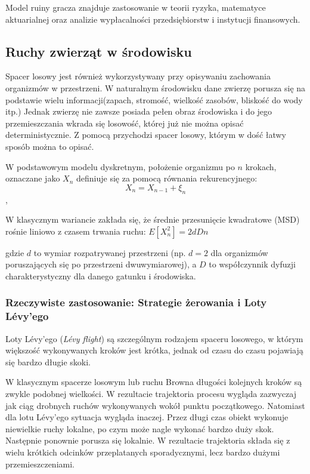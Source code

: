 Model ruiny gracza znajduje zastosowanie w teorii ryzyka, matematyce aktuarialnej oraz analizie wypłacalności przedsiębiorstw i instytucji finansowych.

\subsection{Ruchy zwierząt w środowisku}

Spacer losowy jest również wykorzystywany przy opisywaniu zachowania organizmów w przestrzeni.
W naturalnym środowisku dane zwierzę porusza się na podstawie wielu informacji(zapach, stromość, wielkość zasobów, bliskość do wody itp.) Jednak zwierzę nie zawsze posiada pełen obraz środowiska i do jego przemieszczania wkrada się losowość, której już nie można opisać deterministycznie. Z pomocą przychodzi spacer losowy, którym w dość łatwy sposób można to opisać.

W podstawowym modelu dyskretnym, położenie organizmu po $n$ krokach, oznaczane jako $X_n$ definiuje się za pomocą równania rekurencyjnego: $$X_n = X_{n-1} + \xi_n$$,


W klasycznym wariancie zakłada się, że średnie przesunięcie kwadratowe (MSD) rośnie liniowo z czasem trwania ruchu:
$E[X_n^2]=2dDn$

gdzie $d$ to wymiar rozpatrywanej przestrzeni (np. $d=2$ dla organizmów poruszających się po przestrzeni dwuwymiarowej), a $D$ to współczynnik dyfuzji charakterystyczny dla danego gatunku i środowiska.

\subsubsection*{Rzeczywiste zastosowanie: Strategie żerowania i Loty Lévy'ego}

Loty Lévy'ego (\textit{Lévy flight}) są szczególnym rodzajem spaceru losowego, w którym większość wykonywanych kroków jest krótka, jednak od czasu do czasu pojawiają się bardzo długie skoki.

W klasycznym spacerze losowym lub ruchu Browna długości kolejnych kroków są zwykle podobnej wielkości. W rezultacie trajektoria procesu wygląda zazwyczaj jak ciąg drobnych ruchów wykonywanych wokół punktu początkowego. Natomiast dla lotu Lévy'ego sytuacja wygląda inaczej. Przez długi czas obiekt wykonuje niewielkie ruchy lokalne, po czym może nagle wykonać bardzo duży skok. Następnie ponownie porusza się lokalnie. W rezultacie trajektoria składa się z wielu krótkich odcinków przeplatanych sporadycznymi, lecz bardzo dużymi przemieszczeniami.


